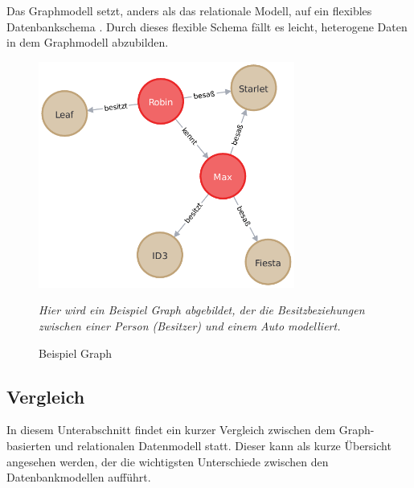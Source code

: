 Das Graphmodell setzt, anders als das relationale Modell, auf ein flexibles Datenbankschema \cite{gdbms}. Durch dieses flexible Schema fällt es leicht, heterogene Daten in dem Graphmodell abzubilden. 

\begin{figure}[ht]
    \centering
    \includegraphics[width=0.75\textwidth]{images/example_graph.pdf}
    \caption{Beispiel Graph}
    \vspace{1em}
    \textit{Hier wird ein Beispiel Graph abgebildet, der die Besitzbeziehungen zwischen einer Person (Besitzer) und einem Auto modelliert.}
    \label{fig:beispiel_graph}
\end{figure}

\subsection{Vergleich}
In diesem Unterabschnitt findet ein kurzer Vergleich zwischen dem Graph-basierten und relationalen Datenmodell statt. Dieser kann als kurze Übersicht angesehen werden, der die wichtigsten Unterschiede zwischen den Datenbankmodellen aufführt. 

